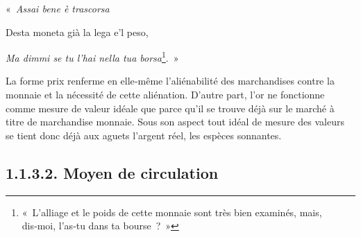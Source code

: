 \documentclass[french,twoside]{book} %
\begin{document}
\begin{center}
\noindent \centerline{« \emph{Assai bene è trascorsa}}\par
\end{center}

\noindent Desta moneta già la lega e'l peso,\par

\begin{center}
\noindent \centerline{\emph{Ma dimmi se tu l’hai nella tua borsa}\footnote{« L’alliage et le poids de cette monnaie sont très bien examinés, mais, dis‑moi, l’as‑tu dans ta bourse ? »}. »}\par
\end{center}

\bigbreak
\noindent La forme prix renferme en elle‑même l’aliénabilité des marchandises contre la monnaie et la nécessité de cette aliénation. D’autre part, l’or ne fonctionne comme mesure de valeur idéale que parce qu’il se trouve déjà sur le marché à titre de marchandise monnaie. Sous son aspect tout idéal de mesure des valeurs se tient donc déjà aux aguets l’argent réel, les espèces sonnantes.
\subsection[{1.1.3.2. Moyen de circulation}]{1.1.3.2. Moyen de circulation}
\end{document}
